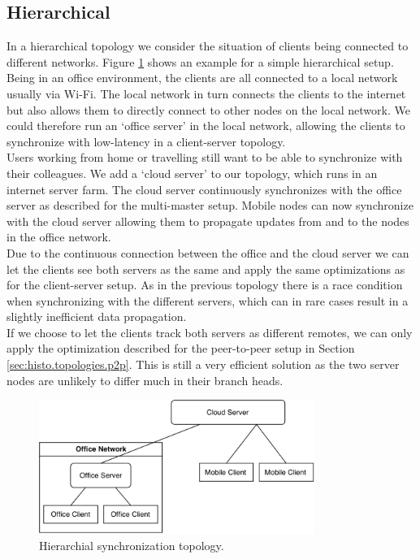 \subsection{Hierarchical}
In a hierarchical topology we consider the situation of clients being connected to different networks.
Figure \ref{fig:histo.topologies.hierarchical} shows an example for a simple hierarchical setup.
Being in an office environment, the clients are all connected to a local network usually via Wi-Fi.
The local network in turn connects the clients to the internet but also allows them to directly connect to other nodes on the local network.
We could therefore run an `office server' in the local network, allowing the clients to synchronize with low-latency in a client-server topology.\\
Users working from home or travelling still want to be able to synchronize with their colleagues.
We add a `cloud server' to our topology, which runs in an internet server farm.
The cloud server continuously synchronizes with the office server as described for the multi-master setup.
Mobile nodes can now synchronize with the cloud server allowing them to propagate updates from and to the nodes in the office network.\\
Due to the continuous connection between the office and the cloud server we can let the clients see both servers as the same and apply the same optimizations as for the client-server setup.
As in the previous topology there is a race condition when synchronizing with the different servers, which can in rare cases result in a slightly inefficient data propagation.\\
If we choose to let the clients track both servers as different remotes, we can only apply the optimization described for the peer-to-peer setup in Section \ref{sec:histo.topologies.p2p}.
This is still a very efficient solution as the two server nodes are unlikely to differ much in their branch heads.

\begin{figure}[!ht]
  \centering
  \includegraphics[width=0.8\textwidth]{img/hierarchical}
  \caption{Hierarchial synchronization topology.}
  \label{fig:histo.topologies.hierarchical}
\end{figure}
